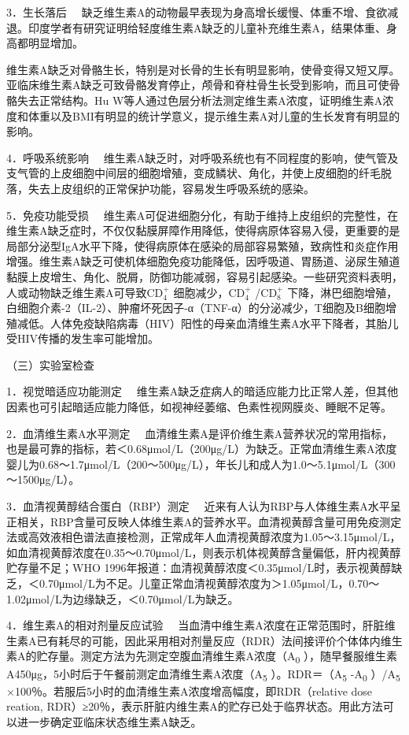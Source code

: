 {3．生长落后}
　缺乏维生素A的动物最早表现为身高增长缓慢、体重不增、食欲减退。印度学者有研究证明给轻度维生素A缺乏的儿童补充维生素A，结果体重、身高都明显增加。

维生素A缺乏对骨骼生长，特别是对长骨的生长有明显影响，使骨变得又短又厚。亚临床维生素A缺乏可致骨骼发育停止，颅骨和脊柱骨生长受到影响，而且可使骨骼失去正常结构。Hu
W等人通过色层分析法测定维生素A浓度，证明维生素A浓度和体重以及BMI有明显的统计学意义，提示维生素A对儿童的生长发育有明显的影响。

{4．呼吸系统影响}
　维生素A缺乏时，对呼吸系统也有不同程度的影响，使气管及支气管的上皮细胞中间层的细胞增殖，变成鳞状、角化，并使上皮细胞的纤毛脱落，失去上皮组织的正常保护功能，容易发生呼吸系统的感染。

{5．免疫功能受损}
　维生素A可促进细胞分化，有助于维持上皮组织的完整性，在维生素A缺乏症时，不仅仅黏膜屏障作用降低，使得病原体容易入侵，更重要的是局部分泌型IgA水平下降，使得病原体在感染的局部容易繁殖，致病性和炎症作用增强。维生素A缺乏可使机体细胞免疫功能降低，因呼吸道、胃肠道、泌尿生殖道黏膜上皮增生、角化、脱屑，防御功能减弱，容易引起感染。一些研究资料表明，人或动物缺乏维生素A可导致$\text{CD}^+_4$
细胞减少，$\text{CD}^+_4$
/$\text{CD}^+_8$
下降，淋巴细胞增殖，白细胞介素-2（IL-2）、肿瘤坏死因子-α（TNF-α）的分泌减少，T细胞及B细胞增殖减低。人体免疫缺陷病毒（HIV）阳性的母亲血清维生素A水平下降者，其胎儿受HIV传播的发生率可能增加。

（三）实验室检查

{1．视觉暗适应功能测定}
　维生素A缺乏症病人的暗适应能力比正常人差，但其他因素也可引起暗适应能力降低，如视神经萎缩、色素性视网膜炎、睡眠不足等。

{2．血清维生素A水平测定}
　血清维生素A是评价维生素A营养状况的常用指标，也是最可靠的指标，若＜0.68μmol/L（200μg/L）为缺乏。正常血清维生素A浓度婴儿为0.68～1.7μmol/L（200～500μg/L），年长儿和成人为1.0～5.1μmol/L（300～1500μg/L）。

{3．血清视黄醇结合蛋白（RBP）测定}
　近来有人认为RBP与人体维生素A水平呈正相关，RBP含量可反映人体维生素A的营养水平。血清视黄醇含量可用免疫测定法或高效液相色谱法直接检测，正常成年人血清视黄醇浓度为1.05～3.15μmol/L，如血清视黄醇浓度在0.35～0.70μmol/L，则表示机体视黄醇含量偏低，肝内视黄醇贮存量不足；WHO
1996年报道：血清视黄醇浓度＜0.35μmol/L时，表示视黄醇缺乏，＜0.70μmol/L为不足。儿童正常血清视黄醇浓度为＞1.05μmol/L，0.70～1.02μmol/L为边缘缺乏，＜0.70μmol/L为缺乏。

{4．维生素A的相对剂量反应试验}
　当血清中维生素A浓度在正常范围时，肝脏维生素A已有耗尽的可能，因此采用相对剂量反应（RDR）法间接评价个体体内维生素A的贮存量。测定方法为先测定空腹血清维生素A浓度（A\textsubscript{0}
），随早餐服维生素A450μg，5小时后于午餐前测定血清维生素A浓度（A\textsubscript{5}
）。RDR＝（A\textsubscript{5} -A\textsubscript{0} ）/A\textsubscript{5}
×100％。若服后5小时的血清维生素A浓度增高幅度，即RDR（relative dose
reation,
RDR）≥20％，表示肝脏内维生素A的贮存已处于临界状态。用此方法可以进一步确定亚临床状态维生素A缺乏。


